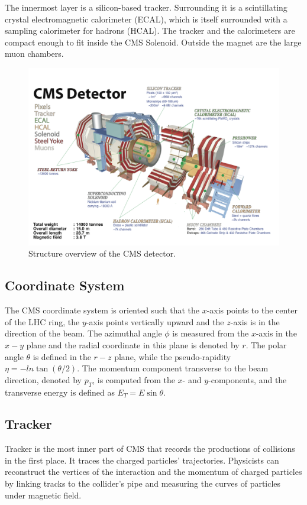 The innermost layer is a silicon-based tracker. Surrounding it is a scintillating crystal electromagnetic calorimeter (ECAL), which is itself surrounded with a sampling calorimeter for hadrons (HCAL). The tracker and the calorimeters are compact enough to fit inside the CMS Solenoid. Outside the magnet are the large muon chambers.

\begin{figure}[hbtp]
  \begin{center}
    \includegraphics[width=\textwidth]{figure/CH2/CMS.png}
  \end{center}
  \caption{\label{fig:CMS}Structure overview of the CMS detector.}
\end{figure}
\subsection*{Coordinate System}

The CMS coordinate system is oriented such that the $x$-axis points to the center of the LHC ring, the $y$-axis points vertically upward and the $z$-axis is in the direction of the beam. The azimuthal angle $\phi$ is measured from the $x$-axis in the $x-y$ plane and the radial coordinate in this plane is denoted by $r$. The polar angle $\theta$ is defined in the $r-z$ plane, while the pseudo-rapidity $\eta = -ln\tan{(\theta/2)}$. The momentum component transverse to the beam direction, denoted by $p_{T}$, is computed from the $x$- and $y$-components, and the transverse energy is defined as $E_{T} = E\sin\theta$.

\subsection{Tracker}
Tracker is the most inner part of CMS that records the productions of collisions in the first place. It traces the charged particles' trajectories. Physicists can reconstruct the vertices of the interaction and the momentum of charged particles by linking tracks to the collider's pipe and measuring the curves of particles under magnetic field.


